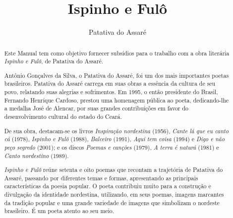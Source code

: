 \documentclass[12pt]{extarticle}
\begin{document}
\newcommand{\AutorLivro}{Patativa do Assaré}
\newcommand{\TituloLivro}{Ispinho e Fulô}
\newcommand{\Tema}{Ficção, mistério e fantasia}
\newcommand{\Genero}{Poema}
\newcommand{\imagemCapa}{./images/PNLD0033-01.png}
\newcommand{\issnppub}{978-65-994389-1-2 }
\newcommand{\issnepub}{978-65-994389-3-6 }
\newcommand{\colaborador}{Vicente Castro e Bruno Gradella} 


\title{\TituloLivro}
\author{\AutorLivro}
\def\authornotes{\colaborador}

\date{}
\maketitle


\begin{abstract}
Este Manual tem como objetivo fornecer subsídios para o trabalho com a
obra literária \emph{Ispinho e Fulô}, de Patativa do Assaré.

Antônio Gonçalves da Silva, o Patativa do Assaré, foi um dos mais 
importantes poetas brasileiros.  Patativa do Assaré carrega em suas obras 
a essência da cultura de seu povo, relatando suas alegrias e sofrimentos. 
Em 1995, o então presidente do Brasil, Fernando Henrique Cardoso, prestou 
uma homenagem pública ao poeta, dedicando-lhe a medalha José de Alencar, 
por suas grandes contribuições em favor do desenvolvimento cultural do 
estado do Ceará.

De sua obra, destacam-se os livros \textit{Inspiração nordestina} (1956), 
\textit{Cante lá que eu canto cá} (1978), \textit{Ispinho e Fulô} (1988), 
\textit{Balceiro} (1991), \textit{Aqui tem coisa} (1994) e \textit{Digo e 
não peço segredo} (2001); e os discos \textit{Poemas e canções} (1979), 
\textit{A terra é naturá} (1981) e \textit{Canto nordestino} (1989).

\emph{Ispinho e Fulô} reúne setenta e oito poemas que recontam a 
trajetória de Patativa do Assaré, passando por diferentes temas e formas, apresentando as principais características da poesia popular. O poeta 
contribuiu muito para a construção e divulgação da identidade nordestina, 
utilizando, em seus poemas, imagens marcantes da tradição popular e uma 
grande variedade de imagens que simbolizam o nordeste brasileiro. É um 
poeta atento ao seu meio.


\end{abstract}
\end{document}
